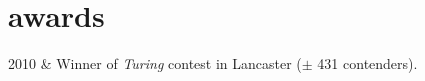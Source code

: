 \documentclass[
    changecolor={70,130,180}, 
]{cv-roald}
\newcommand{\paw}{\faPaw \hspace{.5mm}}
\begin{document}
\section*{\paw{} awards}
\begin{tabularcv}	
2010        &   Winner of \emph{Turing} contest in Lancaster 
                ($\pm$ 431 contenders). 
\end{tabularcv}

%
%
%
    
\end{document}
